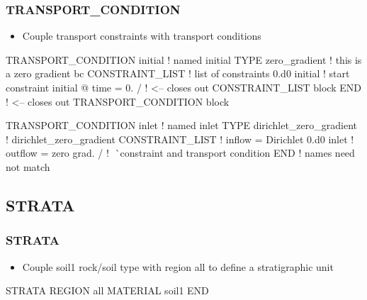 \documentclass{beamer}
\newcommand\redcomment[1]{{{\color{red} #1}}}
\newcommand\bluecomment[1]{{{\color{blue} #1}}}
\newcommand\greencomment[1]{{{\color{green} #1}}}
\begin{document}
\begin{frame}\frametitle{TRANSPORT\_CONDITION}

\begin{itemize}
  \item Couple transport constraints with transport conditions
\end{itemize}
\begin{semiverbatim}
TRANSPORT_CONDITION initial  \bluecomment{! named \greencomment{initial}}
  TYPE zero_gradient       \bluecomment{! this is a \redcomment{zero gradient} bc}
  CONSTRAINT_LIST          \bluecomment{! list of constraints}
    0.d0 initial  \bluecomment{! start constraint \redcomment{initial} @ time = \redcomment{0.}}
  /  \bluecomment{! <-- closes out CONSTRAINT\_LIST block}
END  \bluecomment{! <-- closes out TRANSPORT\_CONDITION block}

TRANSPORT_CONDITION inlet    \bluecomment{! named \greencomment{inlet}}
  TYPE dirichlet_zero_gradient  \bluecomment{! \redcomment{dirichlet_zero_gradient}}
  CONSTRAINT_LIST                 \bluecomment{! inflow = Dirichlet}
    0.d0 inlet                    \bluecomment{! outflow = zero grad.}
  /    \bluecomment{! ^^^^^ constraint and transport condition}
END    \bluecomment{!         names need not match}

\end{semiverbatim}

\end{frame}

\subsection{STRATA}

\begin{frame}[fragile]\frametitle{STRATA}

\begin{itemize}
\item Couple \greencomment{soil1} rock/soil type with region \greencomment{all} to define a stratigraphic unit
\end{itemize}

\begin{semiverbatim}

STRATA
  REGION all
  MATERIAL soil1
END


\end{semiverbatim}

\end{frame}
\end{document}
